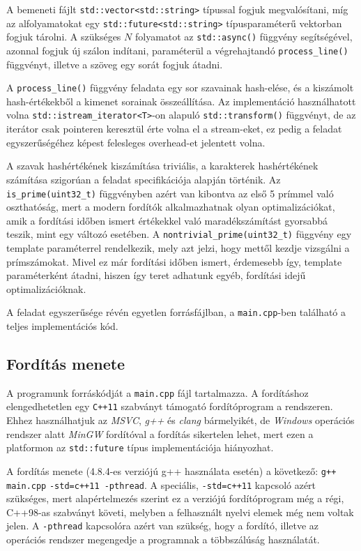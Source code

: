 \documentclass[12pt]{article}
\begin{document}
A bemeneti fájlt \verb|std::vector<std::string>| típussal fogjuk megvalósítani,
míg az alfolyamatokat egy \verb|std::future<std::string>| típusparaméterű vektorban
fogjuk tárolni. A szükséges $N$ folyamatot az \verb|std::async()| függvény
segítségével, azonnal fogjuk új szálon indítani, paraméterül a végrehajtandó
\verb|process_line()| függvényt, illetve a szöveg egy sorát fogjuk átadni.

A \verb|process_line()| függvény feladata egy sor szavainak hash-elése, és a kiszámolt
hash-értékekből a kimenet sorainak összeállítása. Az implementáció használhatott volna
\verb|std::istream_iterator<T>|-on alapuló \verb|std::transform()| függvényt,
de az iterátor csak pointeren keresztül érte volna el a stream-eket, ez pedig a
feladat egyszerűségéhez képest felesleges overhead-et jelentett volna.

A szavak hashértékének kiszámítása triviális, a karakterek hashértékének számítása
szigorúan a feladat specifikációja alapján történik. Az \verb|is_prime(uint32_t)|
függvényben azért van kibontva az első 5 prímmel való oszthatóság, mert a modern
fordítók alkalmazhatnak olyan optimalizációkat, amik a fordítási időben ismert
értékekkel való maradékszámítást gyorsabbá teszik, mint egy változó esetében.
A \verb|nontrivial_prime(uint32_t)| függvény egy template paraméterrel rendelkezik,
mely azt jelzi, hogy mettől kezdje vizsgálni a prímszámokat. Mivel ez már fordítási
időben ismert, érdemesebb így, template paraméterként átadni, hiszen így teret
adhatunk egyéb, fordítási idejű optimalizációknak.

A feladat egyszerűsége révén egyetlen forrásfájlban, a \verb|main.cpp|-ben található a teljes implementációs kód.

\subsection{Fordítás menete}

A programunk forráskódját a \verb|main.cpp| fájl tartalmazza. A fordításhoz
elengedhetetlen egy \verb|C++11| szabványt támogató fordítóprogram a rendszeren.
Ehhez használhatjuk az \textit{MSVC}, \textit{g++} és \textit{clang} bármelyikét,
de \textit{Windows} operációs rendszer alatt \textit{MinGW} fordítóval a fordítás sikertelen lehet,
mert ezen a platformon az \verb|std::future| típus implementációja hiányozhat.

A fordítás menete (4.8.4-es verziójú g++ használata esetén) a következő:  \verb|g++ main.cpp|
\verb|-std=c++11 -pthread|.
A speciális, \verb|-std=c++11| kapcsoló azért
szükséges, mert alapértelmezés szerint ez a verziójú fordítóprogram még a régi, C++98-as
szabványt követi, melyben a felhasznált nyelvi elemek még nem voltak jelen.
A \verb|-pthread| kapcsolóra azért van szükség, hogy a fordító, illetve az operációs
rendszer megengedje a programnak a többszálúság használatát.
\end{document}
